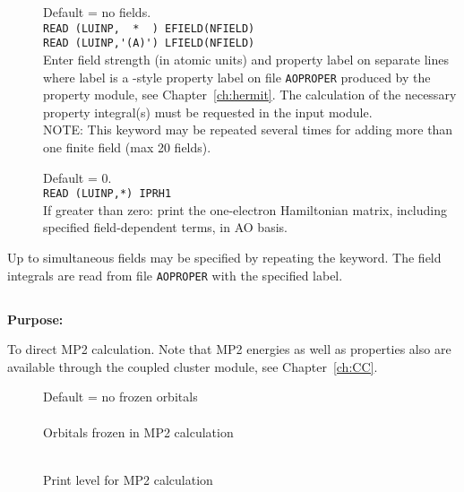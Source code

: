 \begin{description}
\item[]
  Default = no fields. \\
  \verb"READ (LUINP,  *  ) EFIELD(NFIELD)" \\
  \verb"READ (LUINP,'(A)') LFIELD(NFIELD)" \\
  Enter field strength (in atomic units) and property label on separate lines
  where label is a \molecule-style property label on file \verb|AOPROPER|
  produced by the property module, see Chapter~\ref{ch:hermit}.
  The calculation of the necessary property integral(s) must be requested
  in the  input module. \\
  NOTE: This keyword may be repeated several times for adding more than
  one finite field (max 20 fields).

\item[]
  Default = 0.\\
  \verb"READ (LUINP,*) IPRH1" \\
  If greater than zero:
  print the one-electron Hamiltonian matrix, including
  specified field-dependent terms, in AO basis.
\end{description}


Up to \mxfelt simultaneous fields may be specified by repeating the
 keyword.
The field integrals are read from file \verb|AOPROPER| with the specified label.

\pagebreak[3]
\subsection{\label{ref-mp2inp}}

{\bf Purpose:}

To direct MP2 calculation. Note that MP2 energies as well as
properties also are available through the coupled cluster module, see
Chapter~\ref{ch:CC}.

\begin{description}
\item[]
  Default = no frozen orbitals\\
   \\
  Orbitals frozen in MP2 calculation

\item[]
   \\
  Print level for MP2 calculation
\end{description}


